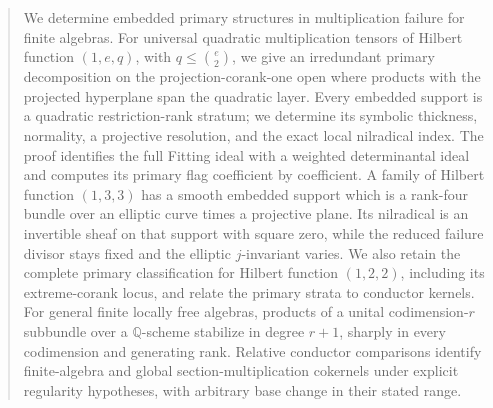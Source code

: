 \begin{abstract}
We determine embedded primary structures in multiplication failure
for finite algebras. For universal quadratic multiplication tensors
of Hilbert function $(1,e,q)$, with $q\le\binom e2$, we give an
irredundant primary decomposition on the projection-corank-one open
where products with the projected hyperplane span the quadratic
layer. Every embedded support is a quadratic restriction-rank
stratum; we determine its symbolic thickness, normality, a projective
resolution, and the exact local nilradical index. The proof identifies
the full Fitting ideal with a weighted determinantal ideal and
computes its primary flag coefficient by coefficient. A family of
Hilbert function $(1,3,3)$ has a smooth embedded support which is a
rank-four bundle over an elliptic curve times a projective plane.
Its nilradical is an invertible sheaf on that support with square
zero, while the reduced failure divisor stays fixed and the elliptic
$j$-invariant varies. We also retain the complete primary classification
for Hilbert function $(1,2,2)$, including its extreme-corank locus,
and relate the primary strata to conductor kernels. For general
finite locally free algebras, products of a unital codimension-$r$
subbundle over a $\mathbb Q$-scheme stabilize in degree $r+1$,
sharply in every codimension and generating rank. Relative conductor
comparisons identify finite-algebra and global section-multiplication
cokernels under explicit regularity hypotheses, with arbitrary base
change in their stated range.
\end{abstract}
\maketitle
